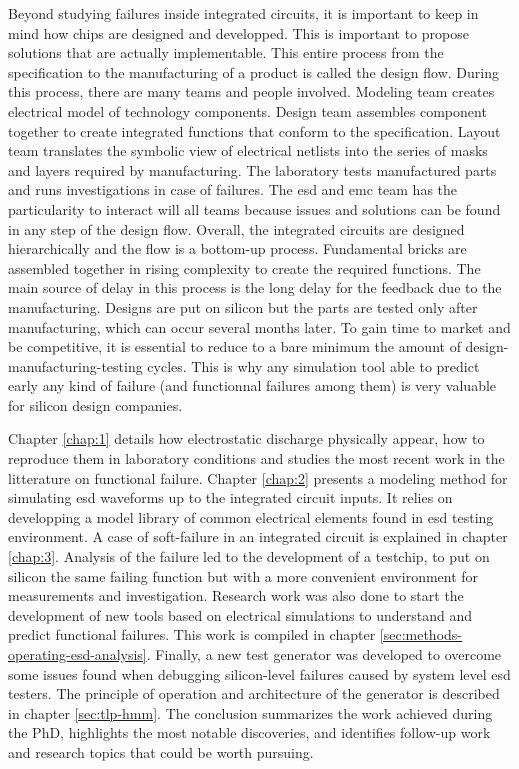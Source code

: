 Beyond studying failures inside integrated circuits, it is important to keep in mind how chips are designed and developped.
This is important to propose solutions that are actually implementable.
This entire process from the specification to the manufacturing of a product is called the design flow.
During this process, there are many teams and people involved.
Modeling team creates electrical model of technology components.
Design team assembles component together to create integrated functions that conform to the specification.
Layout team translates the symbolic view of electrical netlists into the series of masks and layers required by manufacturing.
The laboratory tests manufactured parts and runs investigations in case of failures.
The \gls{esd} and \gls{emc} team has the particularity to interact will all teams because issues and solutions can be found in any step of the design flow.
Overall, the integrated circuits are designed hierarchically and the flow is a bottom-up process.
Fundamental bricks are assembled together in rising complexity to create the required functions.
The main source of delay in this process is the long delay for the feedback due to the manufacturing.
Designs are put on silicon but the parts are tested only after manufacturing, which can occur several months later.
To gain time to market and be competitive, it is essential to reduce to a bare minimum the amount of design-manufacturing-testing cycles.
This is why any simulation tool able to predict early any kind of failure (and functionnal failures among them) is very valuable for silicon design companies.

Chapter \ref{chap:1} details how electrostatic discharge physically appear, how to reproduce them in laboratory conditions and studies the most recent work in the litterature on functional failure.
Chapter \ref{chap:2} presents a modeling method for simulating \gls{esd} waveforms up to the integrated circuit inputs. It relies on developping a model library of common electrical elements found in \gls{esd} testing environment.
A case of soft-failure in an integrated circuit is explained in chapter \ref{chap:3}.
Analysis of the failure led to the development of a testchip, to put on silicon the same failing function but with a more convenient environment for measurements and investigation.
Research work was also done to start the development of new tools based on electrical simulations to understand and predict functional failures.
This work is compiled in chapter \ref{sec:methods-operating-esd-analysis}.
Finally, a new test generator was developed to overcome some issues found when debugging silicon-level failures caused by system level \gls{esd} testers.
The principle of operation and architecture of the generator is described in chapter \ref{sec:tlp-hmm}.
The conclusion summarizes the work achieved during the PhD, highlights the most notable discoveries, and identifies follow-up work and research topics that could be worth pursuing.
